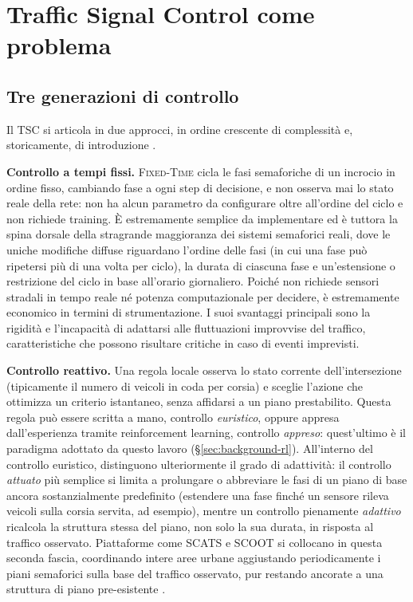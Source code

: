 \section{Traffic Signal Control come problema}
\label{sec:background-tsc}

\subsection{Tre generazioni di controllo}
\label{subsec:tsc-generations}

Il TSC si articola in due approcci, in ordine crescente di complessità e,
storicamente, di introduzione \citep{shams2018atsctaxonomy}.

\textbf{Controllo a tempi fissi.} \textsc{Fixed-Time} cicla le fasi
semaforiche di un incrocio in ordine fisso, cambiando fase a ogni step di
decisione, e non osserva mai lo stato reale della rete: non ha alcun
parametro da configurare oltre all'ordine del ciclo e non richiede
training. È estremamente semplice da implementare ed è tuttora la spina
dorsale della stragrande maggioranza dei sistemi semaforici reali, dove
le uniche modifiche diffuse riguardano l'ordine delle fasi (in cui una
fase può ripetersi più di una volta per ciclo), la durata di ciascuna
fase e un'estensione o restrizione del ciclo in base all'orario
giornaliero. Poiché non richiede sensori stradali in tempo reale né
potenza computazionale per decidere, è estremamente economico in termini
di strumentazione. I suoi svantaggi principali sono la rigidità e
l'incapacità di adattarsi alle fluttuazioni improvvise del traffico,
caratteristiche che possono risultare critiche in caso di eventi
imprevisti.

\textbf{Controllo reattivo.} Una regola locale osserva lo stato corrente
dell'intersezione (tipicamente il numero di veicoli in coda per corsia) e
sceglie l'azione che ottimizza un criterio istantaneo, senza affidarsi a
un piano prestabilito. Questa regola può essere scritta a mano, controllo
\emph{euristico}, oppure appresa dall'esperienza tramite reinforcement
learning, controllo \emph{appreso}: quest'ultimo è il paradigma adottato
da questo lavoro (§\ref{sec:background-rl}). All'interno del controllo
euristico, \citet{shams2018atsctaxonomy} distinguono ulteriormente il grado di
adattività: il controllo \emph{attuato} più semplice si limita a
prolungare o abbreviare le fasi di un piano di base ancora sostanzialmente
predefinito (estendere una fase finché un sensore rileva veicoli sulla
corsia servita, ad esempio), mentre un controllo pienamente
\emph{adattivo} ricalcola la struttura stessa del piano, non solo la sua
durata, in risposta al traffico osservato. Piattaforme come SCATS e SCOOT
si collocano in questa seconda fascia, coordinando intere aree urbane
aggiustando periodicamente i piani semaforici sulla base del traffico
osservato, pur restando ancorate a una struttura di piano pre-esistente
\citep{wei2020tscsurvey}.

